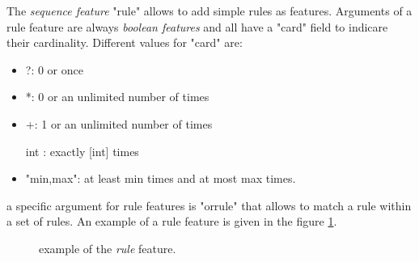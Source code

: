 \documentclass[manual-fr.tex]{subfiles}
\begin{document}
The \textit{sequence feature} "rule" allows to add simple rules as features. Arguments of a rule feature are always \textit{boolean features} and all have a "card" field to indicare their cardinality. Different values for "card" are:
\begin{itemize}
    \item ?: 0 or once
    \item *: 0 or an unlimited number of times
    \item +: 1 or an unlimited number of times
    \item [int]: exactly [int] times
    \item "min,max": at least min times and at most max times.
\end{itemize}

a specific argument for rule features is "orrule" that allows to match a rule within a set of rules. An example of a rule feature is given in the figure \ref{fig:feature-rule}.

\begin{figure}[ht!]
\footnotesize
\begin{xml}
\end{xml}
\caption{example of the \textit{rule} feature.}
\label{fig:feature-rule}
\end{figure}
\end{document}
